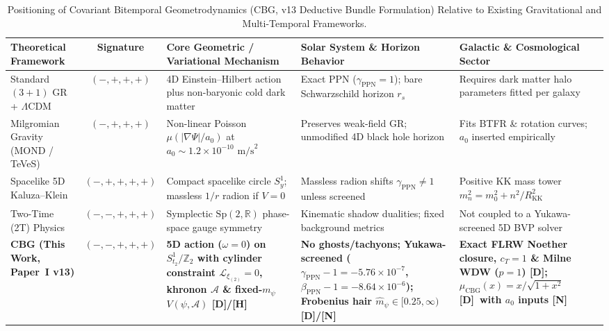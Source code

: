 \documentclass[11pt,a4paper]{article}
\newcommand{\catD}{\textbf{\textcolor{blue!75!black}{[D]}}}
\newcommand{\catH}{\textbf{\textcolor{orange!85!black}{[H]}}}
\newcommand{\catN}{\textbf{\textcolor{teal!75!black}{[N]}}}
\theoremstyle{definition}
\theoremstyle{remark}
\begin{document}
\begin{table}[H]
  \centering
  \caption{Positioning of Covariant Bitemporal Geometrodynamics (CBG, v13 Deductive Bundle Formulation) Relative to Existing Gravitational and Multi-Temporal Frameworks.}
  \label{tab:state_of_the_art_positioning}
  \vspace{0.10cm}
  \footnotesize
  \setlength{\tabcolsep}{3.0pt}
  \renewcommand{\arraystretch}{1.28}
  \begin{tabular*}{\textwidth}{@{\extracolsep{\fill}} >{\raggedright\arraybackslash}p{} c >{\raggedright\arraybackslash}p{} >{\raggedright\arraybackslash}p{} >{\raggedright\arraybackslash}p{} @{}}
    \toprule
    \textbf{Theoretical Framework} & \textbf{Signature} & \textbf{Core Geometric / Variational Mechanism} & \textbf{Solar System \& Horizon Behavior} & \textbf{Galactic \& Cosmological Sector} \\
    \midrule
    Standard $(3+1)$ GR + $\Lambda\text{CDM}$ \cite{Einstein1915,Planck2018} & $(-,+,+,+)$ & 4D Einstein--Hilbert action plus non-baryonic cold dark matter & Exact PPN ($\gamma_{\text{PPN}}=1$); bare Schwarzschild horizon $r_s$ & Requires dark matter halo parameters fitted per galaxy \\
    \addlinespace[2.5pt]
    Milgromian Gravity (MOND / TeVeS) \cite{Milgrom1983,Bekenstein2004} & $(-,+,+,+)$ & Non-linear Poisson $\mu(|\nabla\Psi|/a_0)$ at $a_0 \sim 1.2\times 10^{-10}\text{ m/s}^2$ & Preserves weak-field GR; unmodified 4D black hole horizon & Fits BTFR \& rotation curves; $a_0$ inserted empirically \\
    \addlinespace[2.5pt]
    Spacelike 5D Kaluza--Klein \cite{Kaluza1921,Klein1926,OverduinWesson1997} & $(-,+,+,+,+)$ & Compact spacelike circle $S^1_y$; massless $1/r$ radion if $V=0$ & Massless radion shifts $\gamma_{\text{PPN}} \neq 1$ unless screened & Positive KK mass tower $m_n^2 = m_0^2 + n^2/R_{\text{KK}}^2$ \\
    \addlinespace[2.5pt]
    Two-Time (2T) Physics \cite{Bars1998,Bars2001,Bars2008,Paiman2023} & $(-,-,+,+,+)$ & Symplectic $\text{Sp}(2,\mathbb{R})$ phase-space gauge symmetry & Kinematic shadow dualities; fixed background metrics & Not coupled to a Yukawa-screened 5D BVP solver \\
    \addlinespace[2.5pt]
    \textbf{CBG (This Work, Paper~I v13)} & $\mathbf{(-,-,+,+,+)}$ & \textbf{5D action ($\omega=0$) on $S^1_{t_2}/\mathbb{Z}_2$ with cylinder constraint $\mathcal{L}_{\xi_{(2)}}=0$, khronon $\mathcal{A}$ \& fixed-$m_{\psi}$ $V(\psi,\mathcal{A})$ \catD/\catH} & \textbf{No ghosts/tachyons; Yukawa-screened ($\gamma_{\text{PPN}}-1 = -5.76\times 10^{-7}$, $\beta_{\text{PPN}}-1 = -8.64\times 10^{-6}$); Frobenius hair $\hat{m}_{\psi} \in [0.25,\infty)$ \catD/\catN} & \textbf{Exact FLRW Noether closure, $c_T = 1$ \& Milne WDW ($p=1$) \catD; $\mu_{\text{CBG}}(x) = x/\sqrt{1+x^2}$ \catD\ with $a_0$ inputs \catN} \\
    \bottomrule
  \end{tabular*}
\end{table}
\end{document}

